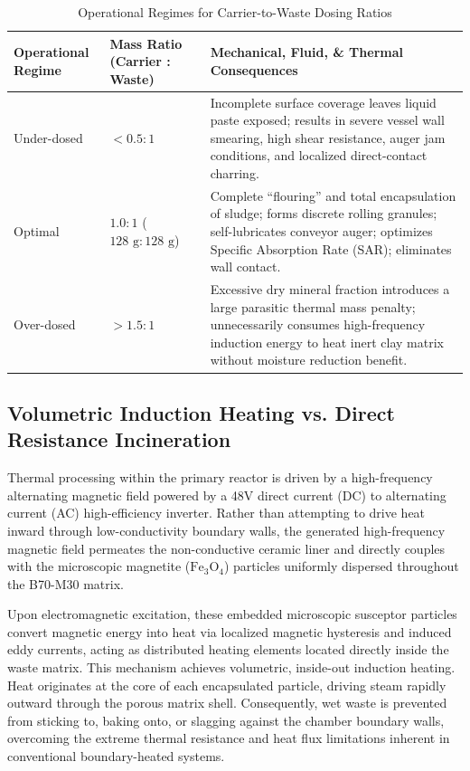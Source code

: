 \documentclass[10pt,twocolumn,a4paper]{article}
\begin{document}
\begin{table}[t]
\centering
\caption{Operational Regimes for Carrier-to-Waste Dosing Ratios}
\label{tab:dosing_regimes}
\begin{tabular}{p{3.0cm} p{3.5cm} p{9.0cm}}
\toprule
\textbf{Operational Regime} & \textbf{Mass Ratio (Carrier : Waste)} & \textbf{Mechanical, Fluid, \& Thermal Consequences} \\
\midrule
Under-dosed & $< 0.5 : 1$ & Incomplete surface coverage leaves liquid paste exposed; results in severe vessel wall smearing, high shear resistance, auger jam conditions, and localized direct-contact charring. \\
Optimal & $1.0 : 1$ ($128\text{ g} : 128\text{ g}$) & Complete ``flouring'' and total encapsulation of sludge; forms discrete rolling granules; self-lubricates conveyor auger; optimizes Specific Absorption Rate (SAR); eliminates wall contact. \\
Over-dosed & $> 1.5 : 1$ & Excessive dry mineral fraction introduces a large parasitic thermal mass penalty; unnecessarily consumes high-frequency induction energy to heat inert clay matrix without moisture reduction benefit. \\
\bottomrule
\end{tabular}
\end{table}

\subsection{Volumetric Induction Heating vs. Direct Resistance Incineration}

Thermal processing within the primary reactor is driven by a high-frequency alternating magnetic field powered by a 48V direct current (DC) to alternating current (AC) high-efficiency inverter. Rather than attempting to drive heat inward through low-conductivity boundary walls, the generated high-frequency magnetic field permeates the non-conductive ceramic liner and directly couples with the microscopic magnetite ($\text{Fe}_3\text{O}_4$) particles uniformly dispersed throughout the B70-M30 matrix.

Upon electromagnetic excitation, these embedded microscopic susceptor particles convert magnetic energy into heat via localized magnetic hysteresis and induced eddy currents, acting as distributed heating elements located directly inside the waste matrix. This mechanism achieves volumetric, inside-out induction heating. Heat originates at the core of each encapsulated particle, driving steam rapidly outward through the porous matrix shell. Consequently, wet waste is prevented from sticking to, baking onto, or slagging against the chamber boundary walls, overcoming the extreme thermal resistance and heat flux limitations inherent in conventional boundary-heated systems.
\end{document}
